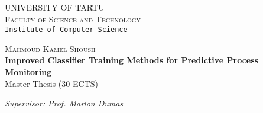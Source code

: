 \begin{titlepage}

\begin{center}



\textsc{UNIVERSITY OF TARTU}\\

\textsc{Faculty of Science and Technology}\\

\texttt{Institute of Computer Science}\\

\vspace{6 cm}


\textsc{ \large Mahmoud Kamel Shoush}\\[0.5cm]
{ \Huge \bfseries Improved Classifier Training Methods for Predictive Process \\[5mm] Monitoring}\\[0.5cm]
{\large Master Thesis (30 ECTS)}\\[3cm]







\begin{minipage}{0.8\textwidth}
\begin{flushright} \large
\emph{Supervisor: Prof. Marlon Dumas}  \\	  %
\end{flushright}
\end{minipage}


\end{center}
\end{titlepage}
